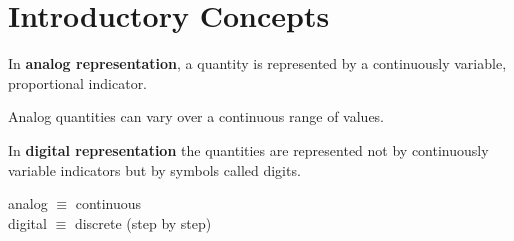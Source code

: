 \chapter{Introductory Concepts}

    \par In \textbf{analog representation}, a quantity is represented by a continuously
    variable, proportional indicator.
    \par Analog quantities can vary over a continuous range of values.
    \par In \textbf{digital representation} the quantities are represented not by
    continuously variable indicators but by symbols called digits.
    \begin{center}
      analog $\equiv$ continuous \\
      digital $\equiv$ discrete (step by step)
    \end{center}


